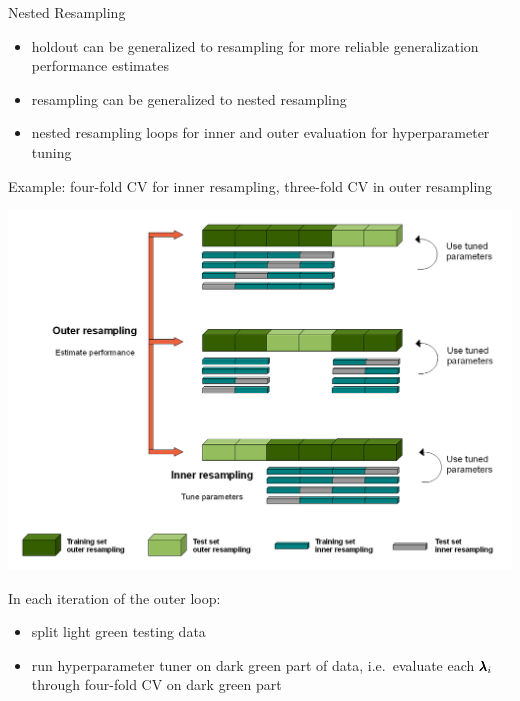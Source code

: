     \begin{frame}[c,allowframebreaks]{Nested Resampling}

        \begin{itemize}
            \item holdout can be generalized to resampling for more reliable
                generalization performance estimates
            \item resampling can be generalized to nested resampling
            \item nested resampling loops for inner and outer evaluation for
                hyperparameter tuning
        \end{itemize}

    \framebreak

    Example: four-fold CV for inner resampling, three-fold CV in outer
    resampling

    \begin{center}
        \includegraphics[height=0.6\textheight]{images/Nested_Resampling}
    \end{center}

    \framebreak

    \begin{footnotesize}
    In each iteration of the outer loop:
    \begin{itemize}
    \item split light green testing data
    \item run hyperparameter tuner on dark green part of data, i.e.\
      evaluate each $\pmb{\lambda}_i$ through four-fold CV on dark green part
    \end{itemize}
    \end{footnotesize}


\end{frame}

